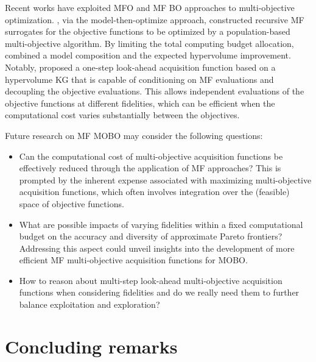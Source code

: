 \documentclass[iicol,sn-basic]{sn-jnl}%
\begin{document}
Recent works have exploited MFO and MF BO approaches to multi-objective optimization.
\cite{Singh2017}, via the model-then-optimize approach, constructed recursive MF surrogates for the objective functions to be optimized by a population-based multi-objective algorithm. 
By limiting the total computing budget allocation, \cite{Khatamsaz2021aiaa} combined a model composition and the expected hypervolume improvement.
Notably, \cite{Daulton2023} proposed a one-step look-ahead
acquisition function based on a hypervolume KG that is capable of conditioning on MF evaluations and decoupling the objective evaluations.
This allows independent evaluations of the objective functions at different fidelities, which can be efficient when the computational cost varies substantially between the objectives.

Future research on MF MOBO may consider the following questions:
\begin{itemize}
	\item Can the computational cost of multi-objective acquisition functions be effectively reduced through the application of MF approaches? This is prompted by the inherent expense associated with maximizing multi-objective acquisition functions, which often involves integration over the (feasible) space of objective functions.
	
	\item What are possible impacts of varying fidelities within a fixed computational budget on the accuracy and diversity of approximate Pareto frontiers? Addressing this aspect could unveil insights into the development of more efficient MF multi-objective acquisition functions for MOBO.
	
	\item How to reason about multi-step look-ahead multi-objective acquisition functions when considering fidelities and do we really need them to further balance exploitation and exploration? 
\end{itemize}

\section{Concluding remarks}\label{Sec7}
\end{document}
